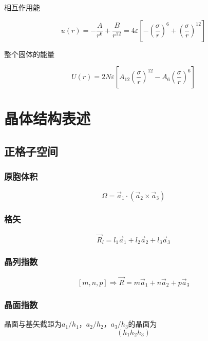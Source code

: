 \documentclass{article}
\begin{document}
\begin{multicols}{2}
相互作用能

\begin{equation*}
  u \left( r \right) = - \frac{A}{r^{6}} + \frac{B}{r^{12}} = 4\varepsilon \left[ - \left( \frac{\sigma}{r} \right)^{6} + \left( \frac{\sigma}{r} \right)^{12} \right] 
\end{equation*}

整个固体的能量

\begin{equation*}
  U \left( r \right) = 2 N \varepsilon \left[ A_{12} \left( \frac{\sigma}{r} \right)^{12} - A_6 \left( \frac{\sigma}{r} \right)^{6} \right] 
\end{equation*}

\section{晶体结构表述}

\subsection{正格子空间}

\subsubsection{原胞体积}

\begin{equation*}
  \Omega = \vec{a}_1 \cdot \left( \vec{a}_2 \times \vec{a}_3 \right)
\end{equation*}

\subsubsection{格矢}

\begin{equation*}
  \vec{R}_l = l_1 \vec{a}_1 + l_2 \vec{a}_2 + l_3 \vec{a}_3
\end{equation*}

\subsubsection{晶列指数}

\begin{equation*}
  \left[ m,n,p \right] \Rightarrow \vec{R} = m \vec{a}_1 + n \vec{a}_2 + p \vec{a}_3 
\end{equation*}

\subsubsection{晶面指数}
晶面与基矢截距为$a_1/h_1$，$a_2/h_2$，$a_3/h_3$的晶面为
\begin{equation*}
  \left( h_1h_2h_3 \right)
\end{equation*}


\end{multicols}
\end{document}

